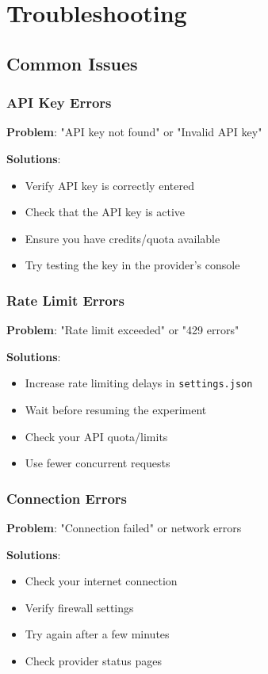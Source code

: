 \documentclass[11pt,a4paper]{article}
\begin{document}
\section{Troubleshooting}
\label{sec:troubleshooting}

\subsection{Common Issues}

\subsubsection{API Key Errors}
\textbf{Problem}: "API key not found" or "Invalid API key"

\textbf{Solutions}:
\begin{itemize}
    \item Verify API key is correctly entered
    \item Check that the API key is active
    \item Ensure you have credits/quota available
    \item Try testing the key in the provider's console
\end{itemize}

\subsubsection{Rate Limit Errors}
\textbf{Problem}: "Rate limit exceeded" or "429 errors"

\textbf{Solutions}:
\begin{itemize}
    \item Increase rate limiting delays in \texttt{settings.json}
    \item Wait before resuming the experiment
    \item Check your API quota/limits
    \item Use fewer concurrent requests
\end{itemize}

\subsubsection{Connection Errors}
\textbf{Problem}: "Connection failed" or network errors

\textbf{Solutions}:
\begin{itemize}
    \item Check your internet connection
    \item Verify firewall settings
    \item Try again after a few minutes
    \item Check provider status pages
\end{itemize}
\end{document}
